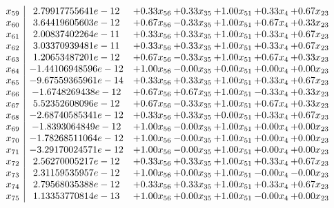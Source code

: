 \documentclass[8pt]{article}
\begin{document}
\[\begin{array}{c| c c@{\hskip 2pt} c@{\hskip 2pt} c@{\hskip 2pt} c@{\hskip 2pt} c@{\hskip 2pt} }
 x_{59}   &  2.79917755641e-12 & +  0.33 x_{56} & +  0.33 x_{35} & +  1.00 x_{51} & +  0.33 x_{4} & +  0.67 x_{23}\\
 x_{60}   &  3.64419605603e-12 & +  0.67 x_{56} & -0.33 x_{35} & +  1.00 x_{51} & +  0.67 x_{4} & +  0.33 x_{23}\\
 x_{61}   &  2.00837402264e-11 & +  0.33 x_{56} & +  0.33 x_{35} & +  1.00 x_{51} & +  0.33 x_{4} & +  0.67 x_{23}\\
 x_{62}   &  3.03370939481e-11 & +  0.33 x_{56} & +  0.33 x_{35} & +  1.00 x_{51} & +  0.33 x_{4} & +  0.67 x_{23}\\
 x_{63}   &  1.20653487201e-12 & +  0.67 x_{56} & -0.33 x_{35} & +  1.00 x_{51} & +  0.67 x_{4} & +  0.33 x_{23}\\
 x_{64}   &  -1.44106948596e-12 & +  1.00 x_{56} & -0.00 x_{35} & +  0.00 x_{51} & +  0.00 x_{4} & +  0.00 x_{23}\\
 x_{65}   &  -9.67559365961e-14 & +  0.33 x_{56} & +  0.33 x_{35} & +  1.00 x_{51} & +  0.33 x_{4} & +  0.67 x_{23}\\
 x_{66}   &  -1.6748269438e-12 & +  0.67 x_{56} & +  0.67 x_{35} & +  1.00 x_{51} & -0.33 x_{4} & +  0.33 x_{23}\\
 x_{67}   &  5.52352608096e-12 & +  0.67 x_{56} & -0.33 x_{35} & +  1.00 x_{51} & +  0.67 x_{4} & +  0.33 x_{23}\\
 x_{68}   &  -2.68740585341e-12 & +  0.33 x_{56} & +  0.33 x_{35} & +  0.00 x_{51} & +  0.33 x_{4} & +  0.67 x_{23}\\
 x_{69}   &  -1.8393064849e-12 & +  1.00 x_{56} & -0.00 x_{35} & +  1.00 x_{51} & +  0.00 x_{4} & +  0.00 x_{23}\\
 x_{70}   &  -1.78268511064e-12 & +  1.00 x_{56} & -0.00 x_{35} & +  1.00 x_{51} & +  0.00 x_{4} & +  0.00 x_{23}\\
 x_{71}   &  -3.29170024571e-12 & +  1.00 x_{56} & -0.00 x_{35} & +  1.00 x_{51} & +  0.00 x_{4} & +  0.00 x_{23}\\
 x_{72}   &  2.56270005217e-12 & +  0.33 x_{56} & +  0.33 x_{35} & +  1.00 x_{51} & +  0.33 x_{4} & +  0.67 x_{23}\\
 x_{73}   &  2.31159535957e-12 & +  1.00 x_{56} & +  0.00 x_{35} & +  1.00 x_{51} & -0.00 x_{4} & -0.00 x_{23}\\
 x_{74}   &  2.79568035388e-12 & +  0.33 x_{56} & +  0.33 x_{35} & +  1.00 x_{51} & +  0.33 x_{4} & +  0.67 x_{23}\\
 x_{75}   &  1.13353770814e-13 & +  1.00 x_{56} & +  0.00 x_{35} & +  1.00 x_{51} & -0.00 x_{4} & +  0.00 x_{23}\\

\end{array}\]
\end{document}
